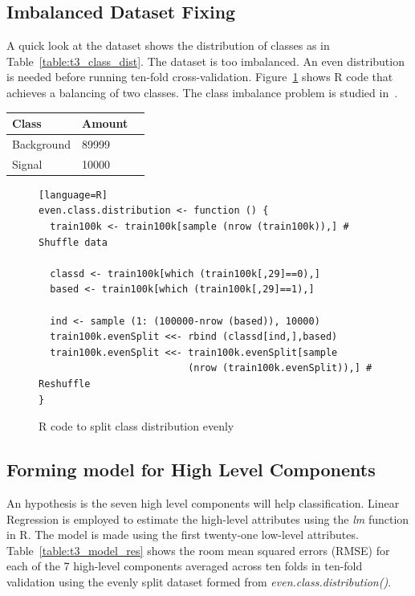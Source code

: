 \documentclass[11pt]{article}
\begin{document}
\subsection{Imbalanced Dataset Fixing}
A quick look at the dataset shows the distribution of classes as in Table~\ref{table:t3_class_dist}. The dataset is too imbalanced. An even distribution is needed before running ten-fold cross-validation. Figure~\ref{fig:t3_balance_r} shows R code that achieves a balancing of two classes. The class imbalance problem is studied in~\cite{japkowicz2002class}.

 \begin{center}   
 \begin{tabular}{@{}llr@{}}
	\toprule[1.5pt]
	Class & Amount\\
	\toprule[1.5pt]
	Background & 89999\\ \midrule
	Signal & 10000\\ 
	\bottomrule[1.25pt]
    \end{tabular}
 \label{table:t3_class_dist}
 \end{center}

 \begin{figure}[H]
\begin{center}
    \begin{lstlisting}[basicstyle=\ttfamily][language=R]
even.class.distribution <- function () {
  train100k <- train100k[sample (nrow (train100k)),] # Shuffle data

  classd <- train100k[which (train100k[,29]==0),]
  based <- train100k[which (train100k[,29]==1),]
 
  ind <- sample (1: (100000-nrow (based)), 10000)
  train100k.evenSplit <<- rbind (classd[ind,],based)
  train100k.evenSplit <<- train100k.evenSplit[sample 
                          (nrow (train100k.evenSplit)),] # Reshuffle
}
\end{lstlisting}
\end{center}
\caption{R code to split class distribution evenly}
\label{fig:t3_balance_r}
\end{figure}

\pagebreak
\subsection{Forming model for High Level Components}
An hypothesis is the seven high level components will help classification. Linear Regression is employed to estimate the high-level attributes using the \textit{lm} function in R. The model is made using the first twenty-one low-level attributes. Table~\ref{table:t3_model_res} shows the room mean squared errors (RMSE) for each of the 7 high-level components averaged across ten folds in ten-fold validation using the evenly split dataset formed from \textit{even.class.distribution()}.
\end{document}
